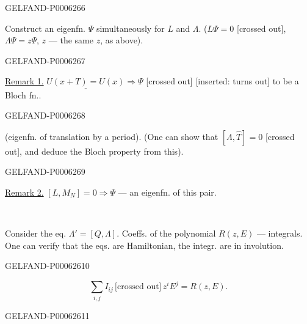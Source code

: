 \begin{GelfandAdjacentEvidence}{GELFAND-P000626}{6}

Construct an eigenfn. \(\Psi\) simultaneously for \(L\) and \(\Lambda\).
(\(L\Psi=0\) [crossed out], \(\Lambda\Psi=z\Psi\),
\(z\) --- the same \(z\), as above).
\end{GelfandAdjacentEvidence}
\begin{GelfandAdjacentEvidence}{GELFAND-P000626}{7}


\underline{Remark 1.} \(\underline{U(x+T)=U(x)}\Longrightarrow\Psi\)
[crossed out] [inserted: turns out] to be a Bloch fn..
\end{GelfandAdjacentEvidence}
\begin{GelfandAdjacentEvidence}{GELFAND-P000626}{8}

(eigenfn. of translation by a period). (One can show that \([\Lambda,\widehat T]=0\) [crossed out],
and deduce the Bloch property from this).
\end{GelfandAdjacentEvidence}
\begin{GelfandAdjacentEvidence}{GELFAND-P000626}{9}


\underline{Remark 2.} \([L,M_N]=0\Longrightarrow\Psi\)
--- an eigenfn. of this pair.
\begin{center}\textemdash\,\textperiodcentered\,\textemdash\end{center}

Consider the eq. \(\Lambda'=[Q,\Lambda]\).
Coeffs. of the polynomial \(R(z,E)\) --- integrals.
One can verify that the eqs. are Hamiltonian, the integr. are in involution.
\end{GelfandAdjacentEvidence}
\begin{GelfandAdjacentEvidence}{GELFAND-P000626}{10}

\[
\sum_{i,j} I_{ij}\,\text{[crossed out]}\, z^iE^j=R(z,E).
\]
\end{GelfandAdjacentEvidence}
\begin{GelfandAdjacentEvidence}{GELFAND-P000626}{11}

\end{GelfandAdjacentEvidence}

